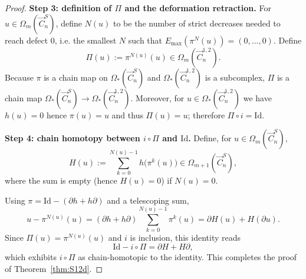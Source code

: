 \documentclass[10pt,a4paper]{amsart}
\begin{document}
\begin{proof}
\textbf{Step 3: definition of $\Pi$ and the deformation retraction.}
For $u\in\Omega_m(\vec{C}_n^S)$, define $N(u)$ to be the number of strict decreases needed to reach defect $0$, i.e.
the smallest $N$ such that $E_{\max}(\pi^N(u))=(0,\dots,0)$. Define
\[
\Pi(u):=\pi^{N(u)}(u)\in \Omega_m(\vec{C}_n^{1,2}).
\]
Because $\pi$ is a chain map on $\Omega_*(\vec{C}_n^S)$ and $\Omega_*(\vec{C}_n^{1,2})$ is a subcomplex,
$\Pi$ is a chain map $\Omega_*(\vec{C}_n^S)\to \Omega_*(\vec{C}_n^{1,2})$.
Moreover, for $u\in\Omega_*(\vec{C}_n^{1,2})$ we have $h(u)=0$ hence $\pi(u)=u$ and thus $\Pi(u)=u$; therefore
$\Pi\circ i=\mathrm{Id}$.

\medskip
\noindent\textbf{Step 4: chain homotopy between $i\circ\Pi$ and $\mathrm{Id}$.}
Define, for $u\in\Omega_m(\vec{C}_n^S)$,
\[
H(u):=\sum_{k=0}^{N(u)-1} h\bigl(\pi^k(u)\bigr)\in \Omega_{m+1}(\vec{C}_n^S),
\]
where the sum is empty (hence $H(u)=0$) if $N(u)=0$.

Using $\pi=\mathrm{Id}-(\partial h+h\partial)$ and a telescoping sum,
\[
u-\pi^{N(u)}(u)=(\partial h+h\partial)\sum_{k=0}^{N(u)-1}\pi^k(u)=\partial H(u)+H(\partial u).
\]
Since $\Pi(u)=\pi^{N(u)}(u)$ and $i$ is inclusion, this identity reads
\[
\mathrm{Id}-i\circ \Pi=\partial H+H\partial,
\]
which exhibits $i\circ\Pi$ as chain-homotopic to the identity.  This completes the proof of Theorem~\ref{thm:S12d}.
\end{proof}
\end{document}
